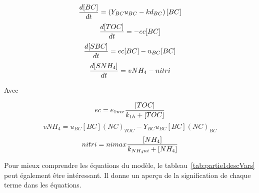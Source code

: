 \begin{equation}
  {{d[BC]}\over{dt}} =
  \left ( Y_{BC} u_{BC} - kd_{BC} \right ) [BC]
  \label{eq:eq1}
\end{equation}
\begin{equation}
  {{d[TOC]}\over{dt}} =
  -ec [BC]
  \label{eq:eq2}
\end{equation}
\begin{equation}
  {{d[SBC]}\over{dt}} =
  ec [BC] - u_{BC} [BC]
  \label{eq:eq3}
\end{equation}
\begin{equation}
  {{d[SNH_4]}\over{dt}} =
  vNH_4 - nitri
  \label{eq:eq4}
\end{equation}

\par{
Avec
}

\begin{equation}
  ec = e_{1mx} {{[TOC]}\over{k_{1h} + [TOC]}}
  \label{eq:eq5}
\end{equation}
\begin{equation}
  vNH_4 = u_{BC} [BC] (NC)_{TOC} - Y_{BC} u_{BC} [BC] (NC)_{BC}
  \label{eq:eq6}
\end{equation}
\begin{equation}
  nitri = nimax {{[NH_4]}\over{k_{NH_4ni}+[NH_4]}}
  \label{eq:eq7}
\end{equation}

\par{
Pour mieux comprendre les équations du modèle, le tableau~\ref{tab:partie1descVars} peut également être
intéressant. Il donne un aperçu de la signification de chaque terme dans les équations.
}

